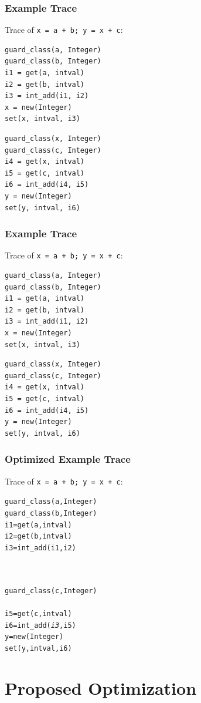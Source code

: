 \documentclass[utf8x]{beamer}
\newcommand\redsout[1]{{\color{red}\sout{\hbox{\color{black}{#1}}}}}
\begin{document}
\begin{frame}[containsverbatim]
  \frametitle{Example Trace}
  Trace of \texttt{x = a + b; y = x + c}:
\begin{verbatim}
guard_class(a, Integer)
guard_class(b, Integer)
i1 = get(a, intval)
i2 = get(b, intval)
i3 = int_add(i1, i2)
x = new(Integer)
set(x, intval, i3)
\end{verbatim}
\pause
\begin{verbatim}
guard_class(x, Integer)
guard_class(c, Integer)
i4 = get(x, intval)
i5 = get(c, intval)
i6 = int_add(i4, i5)
y = new(Integer)
set(y, intval, i6)
\end{verbatim}
\end{frame}

\begin{frame}[containsverbatim]
  \frametitle{Example Trace}
  Trace of \texttt{x = a + b; y = x + c}:
\begin{verbatim}
guard_class(a, Integer)
guard_class(b, Integer)
i1 = get(a, intval)
i2 = get(b, intval)
i3 = int_add(i1, i2)
x = new(Integer)
set(x, intval, i3)
\end{verbatim}
\begin{verbatim}
guard_class(x, Integer)
guard_class(c, Integer)
i4 = get(x, intval)
i5 = get(c, intval)
i6 = int_add(i4, i5)
y = new(Integer)
set(y, intval, i6)
\end{verbatim}
\end{frame}

\begin{frame}[containsverbatim]
  \frametitle{Optimized Example Trace}
  Trace of \texttt{x = a + b; y = x + c}:
\begin{alltt}
guard_class(a, Integer)
guard_class(b, Integer)
i1 = get(a, intval)
i2 = get(b, intval)
i3 = int_add(i1, i2)
\redsout{x = new(Integer)}
\redsout{set(x, intval, i3)}
\end{alltt}
\begin{alltt}
\redsout{guard_class(x, Integer)}
guard_class(c, Integer)
\redsout{i4 = get(x, intval)}
i5 = get(c, intval)
i6 = int_add(\emph{i3}, i5)
y = new(Integer)
set(y, intval, i6)
\end{alltt}
\end{frame}

\section{Proposed Optimization}
\end{document}
